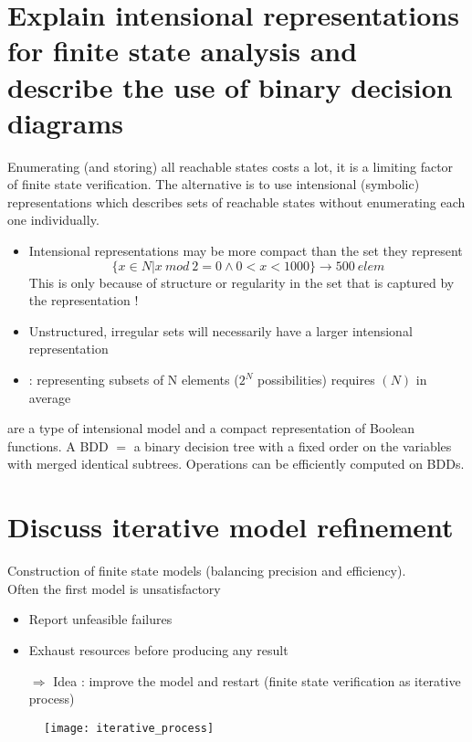 \section{Explain intensional representations for finite state analysis and describe the use of binary decision diagrams}

Enumerating (and storing) all reachable states costs a lot, it is a limiting factor of finite state verification. The alternative is to use intensional (symbolic) representations which describes sets of reachable states without enumerating each one individually.
\begin{itemize}
    \item Intensional representations may be more compact than the set they represent
    $$\{x \in N | x\  mod \ 2 = 0 \wedge 0 < x < 1000  \} \rightarrow 500\  elem$$
    This is only because of structure or regularity in the set that is captured by the representation !
    \item Unstructured, irregular sets will necessarily have a larger intensional representation
    \item {} : representing subsets of N elements ($2^N$ possibilities) requires \bigO$(N)$ in average
\end{itemize}

 are a type of intensional model and a compact representation of Boolean functions. A BDD $=$ a binary decision tree with a fixed order on the variables with merged identical subtrees. Operations can be efficiently computed on BDDs.

\section{Discuss iterative model refinement}

Construction of finite state models (balancing precision and efficiency).\\
Often the first model is unsatisfactory
\begin{itemize}
    \item Report unfeasible failures
    \item Exhaust resources before producing any result
    \item [$\Rightarrow$] Idea : improve the model and restart (finite state verification as iterative process)
\end{itemize}

\begin{figure}[H]
    \centering
    \texttt{[image: iterative\_process]}
\end{figure}

